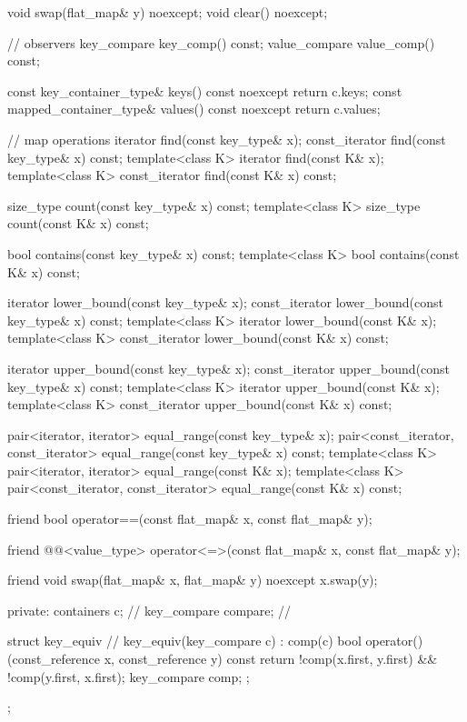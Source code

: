 \begin{codeblock}
{{    void swap(flat_map& y) noexcept;
    void clear() noexcept;

    // observers
    key_compare key_comp() const;
    value_compare value_comp() const;

    const key_container_type& keys() const noexcept      { return c.keys; }
    const mapped_container_type& values() const noexcept { return c.values; }

    // map operations
    iterator find(const key_type& x);
    const_iterator find(const key_type& x) const;
    template<class K> iterator find(const K& x);
    template<class K> const_iterator find(const K& x) const;

    size_type count(const key_type& x) const;
    template<class K> size_type count(const K& x) const;

    bool contains(const key_type& x) const;
    template<class K> bool contains(const K& x) const;

    iterator lower_bound(const key_type& x);
    const_iterator lower_bound(const key_type& x) const;
    template<class K> iterator lower_bound(const K& x);
    template<class K> const_iterator lower_bound(const K& x) const;

    iterator upper_bound(const key_type& x);
    const_iterator upper_bound(const key_type& x) const;
    template<class K> iterator upper_bound(const K& x);
    template<class K> const_iterator upper_bound(const K& x) const;

    pair<iterator, iterator> equal_range(const key_type& x);
    pair<const_iterator, const_iterator> equal_range(const key_type& x) const;
    template<class K> pair<iterator, iterator> equal_range(const K& x);
    template<class K> pair<const_iterator, const_iterator> equal_range(const K& x) const;

    friend bool operator==(const flat_map& x, const flat_map& y);

    friend @@<value_type>
      operator<=>(const flat_map& x, const flat_map& y);

    friend void swap(flat_map& x, flat_map& y) noexcept
      { x.swap(y); }

  private:
    containers c;               // \expos
    key_compare compare;        // \expos

    struct key_equiv {  // \expos
      key_equiv(key_compare c) : comp(c) { }
      bool operator()(const_reference x, const_reference y) const {
        return !comp(x.first, y.first) && !comp(y.first, x.first);
      }
      key_compare comp;
    };
  };

}
\end{codeblock}
